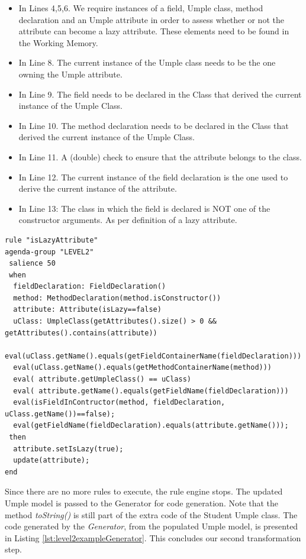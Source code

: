\begin{itemize} 
\item In Lines 4,5,6. We require instances of a field, Umple class, method declaration and an Umple attribute in order to assess whether or not the attribute can become a lazy attribute. These elements need to be found in the Working Memory. 
\item In Line 8. The current instance of the Umple class needs to be the one owning the Umple attribute.
\item In Line 9. The field needs to be declared in the Class that derived the current instance of the Umple Class.
\item In Line 10. The method declaration needs to be declared in the Class that derived the current instance of the Umple Class.
\item In Line 11. A (double) check to ensure that the attribute belongs to the class.
\item In Line 12. The current instance of the field declaration is the one used to derive the current instance of the attribute.
\item In Line 13: The class in which the field is declared is NOT one of the constructor arguments. As per definition of a lazy attribute.
\end{itemize}

\begin{lstlisting}[language={drools},label=lst:isLazyAttribute, caption=Rule isLazyAttribute]
rule "isLazyAttribute"
agenda-group "LEVEL2" 
 salience 50
 when
  fieldDeclaration: FieldDeclaration()
  method: MethodDeclaration(method.isConstructor())
  attribute: Attribute(isLazy==false)
  uClass: UmpleClass(getAttributes().size() > 0 && 							      getAttributes().contains(attribute))
  eval(uClass.getName().equals(getFieldContainerName(fieldDeclaration)))
  eval(uClass.getName().equals(getMethodContainerName(method)))
  eval( attribute.getUmpleClass() == uClass) 
  eval( attribute.getName().equals(getFieldName(fieldDeclaration))) 
  eval(isFieldInContructor(method, fieldDeclaration, uClass.getName())==false);
  eval(getFieldName(fieldDeclaration).equals(attribute.getName()));
 then
  attribute.setIsLazy(true);
  update(attribute);
end
\end{lstlisting}

Since there are no more rules to execute, the rule engine stops. The updated Umple model is passed to the Generator for code generation. Note that the method \textit{toString()} is still part of the extra code of the Student Umple class.
The code generated by the \textit{Generator}, from the populated Umple model, is presented in Listing \ref{lst:level2exampleGenerator}. This concludes our second transformation step.


